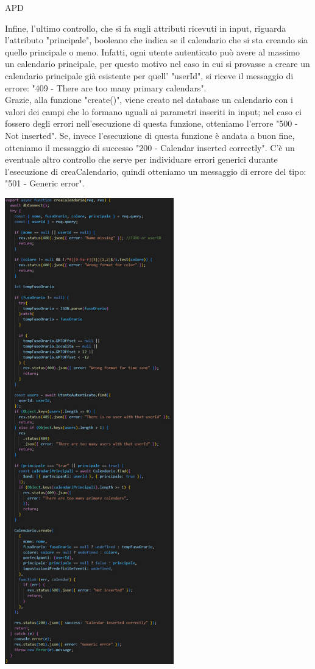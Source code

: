 \begin{listaPersonale} {APD}
\begin{listaPersonale2}[APD]{}
                Infine, l'ultimo controllo, che si fa sugli attributi ricevuti in input, riguarda l'attributo "principale", booleano che indica se il calendario che si sta creando sia quello principale o meno. Infatti, ogni utente autenticato può avere al massimo un calendario principale, per questo motivo nel caso in cui si provasse a creare un calendario principale già esistente per quell' "userId", si riceve il messaggio di errore: "409 - There are too many primary calendars". \\
                Grazie, alla funzione "create()", viene creato nel database un calendario con i valori dei campi che lo formano uguali ai parametri inseriti in input; nel caso ci fossero degli errori nell'esecuzione di questa funzione, otteniamo l'errore "500 - Not inserted". Se, invece l'esecuzione di questa funzione è andata a buon fine, otteniamo il messaggio di successo "200 - Calendar inserted correctly". C'è un eventuale altro controllo che serve per individuare errori generici durante l'esecuzione di creaCalendario, quindi otteniamo un messaggio di errore del tipo: "501 - Generic error".
                \begin{center}
                    \includegraphics[width=0.55\textwidth, height=0.9\textheight]{img/png/APIs/creaCalendario.png}

\end{center}
\end{listaPersonale2}
\end{listaPersonale}
